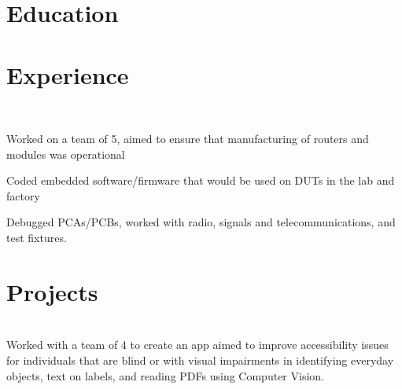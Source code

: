 \documentclass[]{rj-res}
\begin{document}
%
%

%
%


\hfill
\begin{minipage}[t]{1\textwidth} 


\section{Education}
\sectionsep

\section{Experience }
 \\
\vspace{\topsep} %
\begin{tightemize}
\item Worked on a team of 5, aimed to ensure that manufacturing of routers and modules was operational
\item Coded embedded software/firmware that would be used on DUTs in the lab and factory 
\item Debugged PCAs/PCBs, worked with radio, signals and telecommunications, and test fixtures.
\end{tightemize}
\sectionsep


\section{Projects}
 \\
Worked with a team of 4 to create an app aimed to improve accessibility issues for individuals that are blind or with visual impairments in identifying everyday objects, text on labels, and reading PDFs using Computer Vision.
\sectionsep


\end{minipage}
\end{document}
